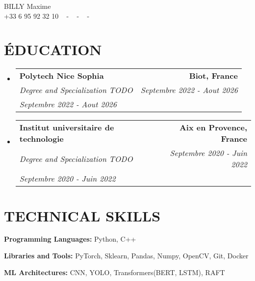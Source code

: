 \documentclass[letterpaper,11pt]{article}
\makeatletter
\newcommand{\resumeSubheading}[4]{
  \vspace{-2pt}\item
    \begin{tabular*}{1.0\textwidth}[t]{l@{\extracolsep{\fill}}r}
      \textbf{\large#1} & \textbf{\small #2} \\
      \textit{\large#3} & \textit{\small #4} \\
      \textit{\large#4}

    \end{tabular*}\vspace{-7pt}
}
\newcommand{\resumeSubHeadingListStart}{\begin{itemize}[leftmargin=0.0in, label={}]}
\newcommand{\resumeSubHeadingListEnd}{\end{itemize}}
\makeatother
\begin{document}


\begin{center}
    {\huge BILLY Maxime} \\ \vspace{2pt}
    {+33 6 95 92 32 10} ~
    \small{-}
    \href{mailto:maxime.billy@etu.univ-cotedazur.fr}{\color{blue}{maxime.billy@etu.univ-cotedazur.fr}} ~
    \small{-}
    \href{https://www.linkedin.com/in/maxime-billy/}{ \color{blue}{linkedin.com/in/maxime-billy}}  ~
    \small{-}
    \href{https://github.com/ozeliurs}{ \color{blue}{github.com/ozeliurs}} ~
    \vspace{-5pt}
\end{center}

\section{\color{airforceblue}ÉDUCATION}
  \resumeSubHeadingListStart
    \resumeSubheading
      {Polytech Nice Sophia}{Biot, France}
      {Degree and Specialization TODO}{Septembre 2022 - Aout 2026}
     \resumeSubheading
      {Institut universitaire de technologie}{Aix en Provence, France}
      {Degree and Specialization TODO}{Septembre 2020 - Juin 2022}
  \resumeSubHeadingListEnd
  \vspace{-10pt}

\section{\color{airforceblue}TECHNICAL SKILLS}
 \begin{itemize}[leftmargin=0in, label={}]
    \small{\item{
     \textbf{\normalsize{Programming Languages:}}{ \normalsize{Python, C++}} \\
      \vspace{1.2pt}

     \textbf{\normalsize{Libraries and Tools:}}{ \normalsize{PyTorch,  Sklearn, Pandas, Numpy, OpenCV, Git, Docker}} \\
      \vspace{1.2pt}

     \textbf{\normalsize{ML Architectures:}}{ \normalsize{CNN, YOLO, Transformers(BERT, LSTM), RAFT}}

     }}
 \end{itemize}
 \vspace{-16pt}
\end{document}
